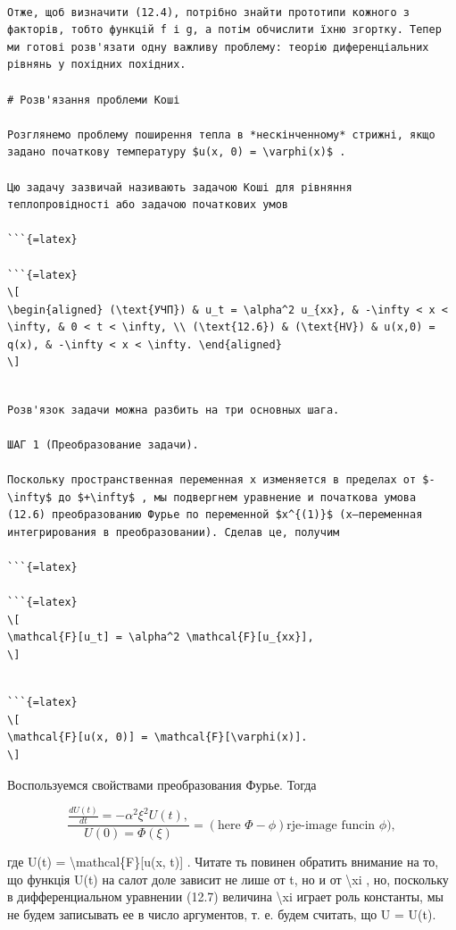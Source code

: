 \documentclass[
]{article}
\begin{document}
\begin{verbatim}

Отже, щоб визначити (12.4), потрібно знайти прототипи кожного з факторів, тобто функцій f і g, а потім обчислити їхню згортку. Тепер ми готові розв'язати одну важливу проблему: теорію диференціальних рівнянь у похідних похідних.

# Розв'язання проблеми Коші

Розглянемо проблему поширення тепла в *нескінченному* стрижні, якщо задано початкову температуру $u(x, 0) = \varphi(x)$ .

Цю задачу зазвичай називають задачою Коші для рівняння теплопровідності або задачою початкових умов

```{=latex}

```{=latex}
\[
\begin{aligned} (\text{УЧП}) & u_t = \alpha^2 u_{xx}, & -\infty < x < \infty, & 0 < t < \infty, \\ (\text{12.6}) & (\text{HV}) & u(x,0) = q(x), & -\infty < x < \infty. \end{aligned}
\]
\end{verbatim}

\begin{verbatim}

Розв'язок задачи можна разбить на три основных шага.

ШАГ 1 (Преобразование задачи).

Поскольку пространственная переменная x изменяется в пределах от $-\infty$ до $+\infty$ , мы подвергнем уравнение и початкова умова (12.6) преобразованию Фурье по переменной $x^{(1)}$ (x—переменная интегрирования в преобразовании). Сделав це, получим

```{=latex}

```{=latex}
\[
\mathcal{F}[u_t] = \alpha^2 \mathcal{F}[u_{xx}],
\]
\end{verbatim}

\begin{verbatim}

```{=latex}
\[
\mathcal{F}[u(x, 0)] = \mathcal{F}[\varphi(x)].
\]
\end{verbatim}

Воспользуемся свойствами преобразования Фурье. Тогда

\[
\frac{\frac{dU(t)}{dt} = -\alpha^2 \xi^2 U(t), }{U(0) = \Phi(\xi)} = (\text{here } \Phi - \phi) \text{rje-image funcin } \phi),
\]

где U(t) = \textbackslash mathcal\{F\}{[}u(x, t){]} . Читате ть повинен
обратить внимание на то, що функція U(t) на салот доле зависит не лише
от t, но и от \textbackslash xi , но, поскольку в дифференциальном
уравнении (12.7) величина \textbackslash xi играет роль константы, мы не
будем записывать ее в число аргументов, т. е. будем считать, що U =
U(t).
\end{document}
